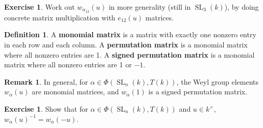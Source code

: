 \documentclass[12pt]{article}
\theoremstyle{definition}
\newtheorem{definition}[theorem]{Definition}
\newtheorem{remark}[theorem]{Remark}
\newtheorem{exercise}[theorem]{Exercise}
\newcommand{\tbf}{\textbf}
\newcommand{\inv}{^{-1}}
\DeclareMathOperator{\SL}{SL}
\begin{document}
\begin{exercise}
Work out $w_{\alpha_{12}}(u)$ in more generality (still in $\SL_3(k)$), by doing concrete matrix multiplication with $e_{12}(u)$ matrices.
\end{exercise}

\begin{definition}
A \tbf{monomial matrix} is a matrix with exactly one nonzero entry in each row and each column. A \tbf{permutation matrix} is a monomial matrix where all nonzero entries are 1. A \tbf{signed permutation matrix} is a monomial matrix where all nonzero entries are 1 or $-1$.
\end{definition}

\begin{remark}
In general, for $\alpha \in \Phi(\SL_n(k), T(k))$, the Weyl group elements $w_\alpha(u)$ are monomial matrices, and $w_\alpha(1)$ is a signed permutation matrix.
\end{remark}

\begin{exercise}
Show that for $\alpha \in \Phi(\SL_n(k), T(k))$ and $u \in k^\times$, $w_\alpha(u) \inv = w_\alpha(-u)$.
\end{exercise}
\end{document}
